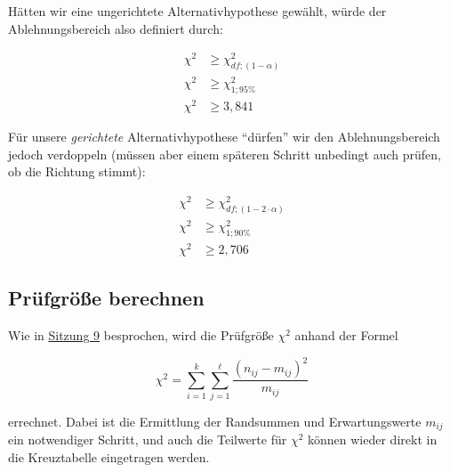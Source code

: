 \documentclass[
  11pt,
  ngerman,
  a4paper,
]{report}
\begin{document}
Hätten wir eine ungerichtete Alternativhypothese gewählt, würde der Ablehnungsbereich also definiert durch:

\[
\begin{aligned}
\chi^2 &\geq \chi^2_{df;(1-\alpha)}\\
\chi^2 &\geq \chi^2_{1;95\%}\\
\chi^2 &\geq 3{,}841
\end{aligned}
 \]

Für unsere \emph{gerichtete} Alternativhypothese \enquote{dürfen} wir den Ablehnungsbereich jedoch verdoppeln (müssen aber einem späteren Schritt unbedingt auch prüfen, ob die Richtung stimmt):

\[
\begin{aligned}
\chi^2 &\geq \chi^2_{df;(1-2\cdot\alpha)}\\
\chi^2 &\geq \chi^2_{1;90\%}\\
\chi^2 &\geq 2{,}706
\end{aligned}
\]

\hypertarget{pruxfcfgruxf6uxdfe-berechnen-4}{%
\subsection{Prüfgröße berechnen}\label{pruxfcfgruxf6uxdfe-berechnen-4}}

Wie in \protect\hyperlink{berechnung-des-kontingenzkoeffizenten-chi2}{Sitzung 9} besprochen, wird die Prüfgröße \(\chi^2\) anhand der Formel

\[
\chi^2= \sum_{i=1}^{k}\sum_{j=1}^{\ell}\frac{(n_{ij}-m_{ij})^{2}}{m_{ij}}
\label{eq:chisq}
\]

errechnet. Dabei ist die Ermittlung der Randsummen und Erwartungswerte \(m_{ij}\) ein notwendiger Schritt, und auch die Teilwerte für \(\chi^2\) können wieder direkt in die Kreuztabelle eingetragen werden.
\end{document}
